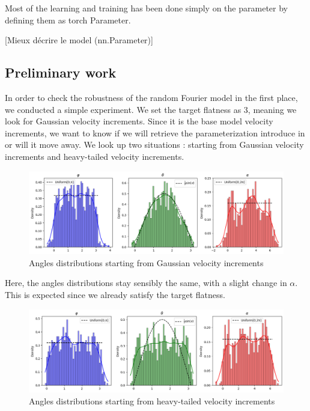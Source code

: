 \documentclass[a4paper,12pt]{article}
\theoremstyle{definition}
\begin{document}
\bigskip
Most of the learning and training has been done simply on the parameter by defining them as torch Parameter. 

[Mieux décrire le model (nn.Parameter)]

\subsection{Preliminary work}
In order to check the robustness of the random Fourier model in the first place, we conducted a simple experiment. We set the target flatness as 3, meaning we look for Gaussian velocity increments. Since it is the base model velocity increments, we want to know if we will retrieve the parameterization introduce in \cite{Janin2021} or will it move away. We look up two situations : starting from Gaussian velocity increments and heavy-tailed velocity increments.

\begin{figure}[H]
    \centering
    \includegraphics[width=1.0\linewidth]{illustrations/StartGaussian.png}
    \caption{Angles distributions starting from Gaussian velocity increments}
\end{figure}

Here, the angles distributions stay sensibly the same, with a slight change in $\alpha$. This is expected since we already satisfy the target flatness.

\begin{figure}[H]
    \centering
    \includegraphics[width=1.0\linewidth]{illustrations/StartHeavyTail.png}
    \caption{Angles distributions starting from heavy-tailed velocity increments}
\end{figure}
\end{document}

